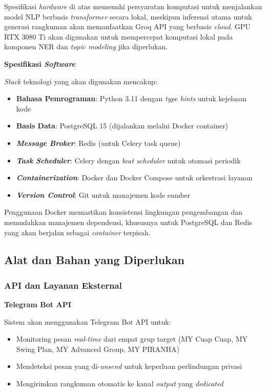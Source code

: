 Spesifikasi \textit{hardware} di atas memenuhi persyaratan komputasi untuk menjalankan model NLP berbasis \textit{transformer} secara lokal, meskipun inferensi utama untuk generasi rangkuman akan memanfaatkan Groq API yang berbasis \textit{cloud}. GPU RTX 3080 Ti akan digunakan untuk mempercepat komputasi lokal pada komponen NER dan \textit{topic modeling} jika diperlukan.

\textbf{Spesifikasi \textit{Software}}

\textit{Stack} teknologi yang akan digunakan mencakup:
\begin{itemize}
\item \textbf{Bahasa Pemrograman}: Python 3.11 dengan \textit{type hints} untuk kejelasan kode
\item \textbf{Basis Data}: PostgreSQL 15 (dijalankan melalui Docker container)
\item \textbf{\textit{Message Broker}}: Redis (untuk Celery task queue)
\item \textbf{\textit{Task Scheduler}}: Celery dengan \textit{beat scheduler} untuk otomasi periodik
\item \textbf{\textit{Containerization}}: Docker dan Docker Compose untuk orkestrasi layanan
\item \textbf{\textit{Version Control}}: Git untuk manajemen kode sumber
\end{itemize}

Penggunaan Docker memastikan konsistensi lingkungan pengembangan dan memudahkan manajemen dependensi, khususnya untuk PostgreSQL dan Redis yang akan berjalan sebagai \textit{container} terpisah.

\subsection{Alat dan Bahan yang Diperlukan}

\subsubsection{API dan Layanan Eksternal}

\textbf{Telegram Bot API}

Sistem akan menggunakan Telegram Bot API untuk:
\begin{itemize}
\item Monitoring pesan \textit{real-time} dari empat grup target (MY Cuap Cuap, MY Swing Plan, MY Advanced Group, MY PIRANHA)
\item Mendeteksi pesan yang di-\textit{unsend} untuk keperluan perlindungan privasi
\item Mengirimkan rangkuman otomatis ke kanal \textit{output} yang \textit{dedicated}
\end{itemize}

